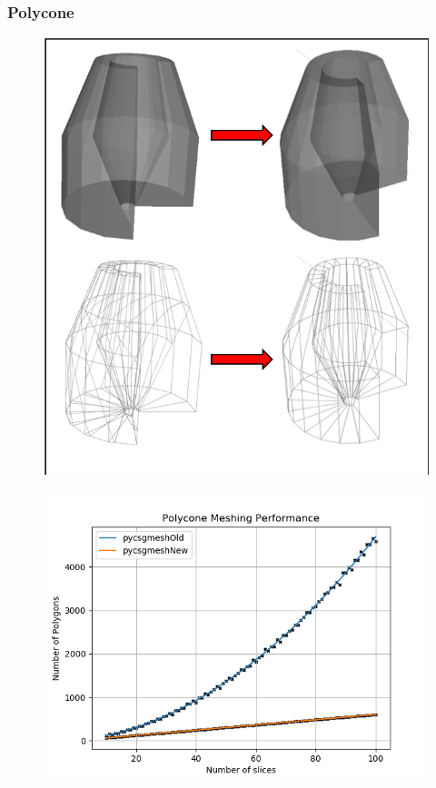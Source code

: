 \documentclass[12pt,a4paper]{article}
\begin{document}
\subsubsection{Polycone}
\begin{figure}[h!]
\centering
\begin{minipage}{.2\textwidth}
  \centering
  \includegraphics[height=1\linewidth]{Images//Meshes//polycone.png}
  \label{fig:test1}
\end{minipage}%
\begin{minipage}{.3\textwidth}
  \centering
  \includegraphics[scale=0.35]{Images//Quad_fits//Polycone_quad.png}
  \label{fig:test2}
\end{minipage}%
\end{figure}
\end{document}
